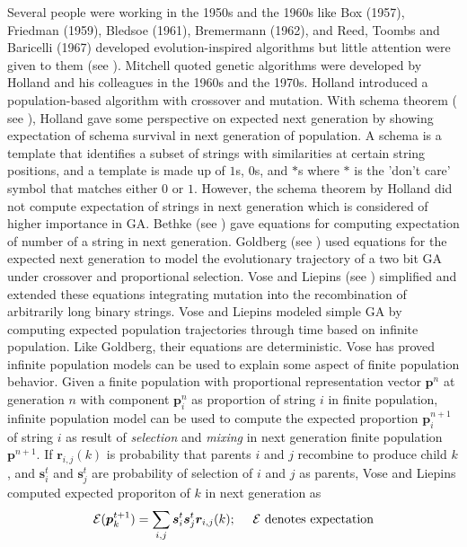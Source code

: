 Several people were working in the 1950s and the 1960s like Box (1957), Friedman (1959),
Bledsoe (1961), Bremermann (1962), and Reed, Toombs and Baricelli (1967) developed evolution-inspired algorithms 
but little attention were given to them (see \cite{Mitchell1999}). Mitchell quoted genetic algorithms were developed by Holland 
and his colleagues in the 1960s and the 1970s. Holland introduced a population-based algorithm with crossover and mutation. 
With schema theorem ( see \cite{Holland1975}), 
Holland gave some perspective on expected next generation by showing expectation of schema survival in 
next generation of population. A schema is a template that identifies a subset of strings with similarities 
at certain string positions, and a template is made up of $1$s, $0$s, and $\ast$s where 
$\ast$ is the 'don't care' symbol that matches either $0$ or $1$. However, the schema theorem by Holland 
did not compute expectation of strings in next generation which is considered of higher importance in GA. 
Bethke (see \cite{Bethke1981}) gave equations for computing expectation of number of a string in next generation. 
Goldberg (see \cite{Goldberg1987}) used equations 
for the expected next generation to model the evolutionary trajectory of a two bit GA under crossover 
and proportional selection. Vose and Liepins (see \cite{VoseLiepins1991}) simplified and extended 
these equations integrating mutation into the recombination of arbitrarily long binary strings. 
Vose and Liepins modeled simple GA by computing expected population trajectories through time based 
on infinite population. Like Goldberg, their equations are deterministic. 
Vose has proved infinite population models can be used  to explain some aspect of finite population behavior. 
Given a finite population with proportional representation vector $\bm{p}^n$ at generation $n$ with 
component $\bm{p}_i^n$ as proportion of string $i$ in finite population, infinite population model 
can be used to compute the expected proportion $\bm{p}_i^{n+1}$ of string $i$ as result of \textit{selection} and 
\textit{mixing} in next generation finite population $\bm{p}^{n+1}$.  
If $\bm{r}_{i,j}(k)$ is probability that parents $i$ and $j$ recombine to produce child $k$, and $\bm{s}_i^t$ and $\bm{s}_j^t$ 
are probability of selection of $i$ and $j$ as parents, Vose and Liepins computed expected proporiton of $k$ in next generation as
\[
\mathcal{E}(\bm{p}_k^{t+1}) = \sum_{i,j} \bm{s}_i^t \bm{s}_j^t \bm{r}_{i,j}(k) ; \text{\hspace{10pt} $\mathcal{E}$ denotes expectation}
\]
